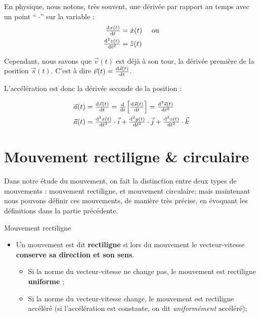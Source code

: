 \documentclass[11pt,a4paper]{article}
\begin{document}
\begingroup
\begin{table}
\begin{rmrq}
En physique, nous notons, très souvent, une dérivée par rapport au temps avec un point `` $\cdot$''  sur la variable  : 
\begin{align*}
    \od{x(t)}{t} &= \dot{x}(t) \quad \text{ ou} \\
    \od[2]{z(t)}{t} &= \Ddot{z}(t)
\end{align*}
\end{rmrq}
\end{table}  

Cependant, nous savons que $\vec{v}(t)$ est déjà à son tour, la dérivée première de la position $\vec{s}(t)$. C'est à dire $\vec{v}(t) = \od{\vec{s}(t)}{t}$. 

L'accélération est donc la dérivée seconde de la position : 

\begin{align*}
    \Vec{a}(t) &= \od{\Vec{v}(t)}{t} = \od{ }{t}\Big[ \od{\vec{s}(t)}{t} \Big] = \od[2]{\vec{s}(t)}{t}\\
    \Vec{a}(t) &= \od[2]{x(t)}{t}\cdot \Vec{i} + \od[2]{y(t)}{t}\cdot \Vec{j} + \od[2]{z(t)}{t}\cdot \Vec{k} \\
\end{align*}
\endgroup

\section{Mouvement rectiligne \& circulaire}

Dans notre étude du mouvement, on fait la distinction entre deux types de mouvements : mouvement rectiligne, et mouvement circulaire; mais maintenant nous pouvons définir ces mouvements, de manière très précise, en évoquant les définitions dans la partie précédente. 
\begin{defn}{Mouvement rectiligne }
\begin{itemize}
    \item Un mouvement est dit \textbf{rectiligne} si lors du mouvement le vecteur-vitesse \textbf{conserve sa direction et son sens}. 
    \begin{itemize}
        \item Si la norme du vecteur-vitesse ne change pas, le mouvement est rectiligne \textbf{uniforme} ;
        \item Si la norme du vecteur-vitesse change, le mouvement est rectiligne accéléré (si l'accélération est constante, on dit \textit{uniformément} accéléré);
    \end{itemize}
\end{itemize}
\end{defn}
\end{document}
